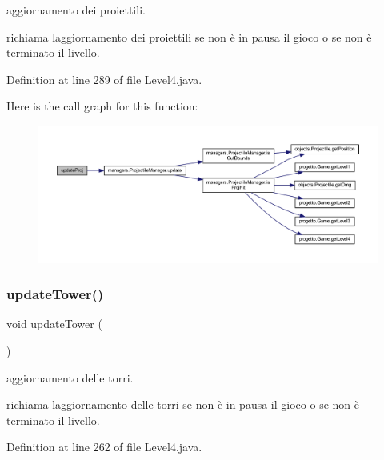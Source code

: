 aggiornamento dei proiettili. 

richiama l\textquotesingle{}aggiornamento dei proiettili se non è in pausa il gioco o se non è terminato il livello. 

Definition at line 289 of file Level4.\+java.

Here is the call graph for this function\+:\nopagebreak
\begin{figure}[H]
\begin{center}
\leavevmode
\includegraphics[width=350pt]{classscenes_1_1_level4_ac83c203b559f6fd0bb225744d7ccf854_cgraph}
\end{center}
\end{figure}
\mbox{\label{classscenes_1_1_level4_ae4fd4a959e4d782a5e7ac0eff77ba27f}} 
\subsubsection{\texorpdfstring{update\+Tower()}{updateTower()}}
{\footnotesize\ttfamily void update\+Tower (\begin{DoxyParamCaption}{ }\end{DoxyParamCaption})}



aggiornamento delle torri. 

richiama l\textquotesingle{}aggiornamento delle torri se non è in pausa il gioco o se non è terminato il livello. 

Definition at line 262 of file Level4.\+java.

